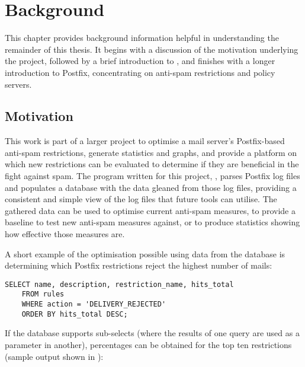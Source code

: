 \chapter{Background}

\label{background}

This chapter provides background information helpful in understanding the
remainder of this thesis.  It begins with a discussion of the motivation
underlying the project, followed by a brief introduction to ,
and finishes with a longer introduction to Postfix, concentrating on
anti-spam restrictions and policy servers.

\section{Motivation}

\label{motivation}

This work is part of a larger project to optimise a mail server's
Postfix-based anti-spam restrictions, generate statistics and graphs, and
provide a platform on which new restrictions can be evaluated to determine
if they are beneficial in the fight against spam.  The program written for
this project, \parsername{}, parses Postfix log files and populates a
database with the data gleaned from those log files, providing a consistent
and simple view of the log files that future tools can utilise.  The
gathered data can be used to optimise current anti-spam measures, to
provide a baseline to test new anti-spam measures against, or to produce
statistics showing how effective those measures are.

A short example of the optimisation possible using data from the database
is determining which Postfix restrictions reject the highest number of
mails:

\begin{verbatim}
SELECT name, description, restriction_name, hits_total
    FROM rules
    WHERE action = 'DELIVERY_REJECTED'
    ORDER BY hits_total DESC;
\end{verbatim}

If the database supports sub-selects (where the results of one query are
used as a parameter in another), percentages can be obtained for the top
ten restrictions (sample output shown in ):




